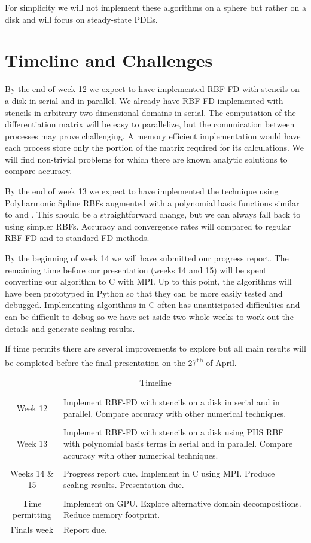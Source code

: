 \documentclass[12pt]{article}
\begin{document}
	For simplicity we will not implement these algorithms on a sphere but rather on a disk and will focus on steady-state PDEs.
	
\section{Timeline and Challenges}
	By the end of week 12 we expect to have implemented RBF-FD with stencils on a disk in serial and in parallel. We already have RBF-FD implemented with stencils in arbitrary two dimensional domains in serial. The computation of the differentiation matrix will be easy to parallelize, but the comunication between processes may prove challenging. A memory efficient implementation would have each process store only the portion of the matrix required for its calculations. We will find non-trivial problems for which there are known analytic solutions to compare accuracy.
	
	By the end of week 13 we expect to have implemented the technique using Polyharmonic Spline RBFs augmented with a polynomial basis functions similar to \cite{Flyer2016-1} and \cite{Flyer2017-2}. This should be a straightforward change, but we can always fall back to using simpler RBFs. Accuracy and convergence rates will compared to regular RBF-FD and to standard FD methods.
	
	
	By the beginning of week 14 we will have submitted our progress report. The remaining time before our presentation (weeks 14 and 15) will be spent converting our algorithm to C with MPI. Up to this point, the algorithms will have been prototyped in Python so that they can be more easily tested and debugged. Implementing algorithms in C often has unanticipated difficulties and can be difficult to debug so we have set aside two whole weeks to work out the details and generate scaling results. 
	
	If time permits there are several improvements to explore but all main results will be completed before the final presentation on the 27\textsuperscript{th} of April.
	
	\begin{table}
		\caption{Timeline}
		\begin{tabular}{ c| p{12cm}} 
			Week 12 & Implement RBF-FD with stencils on a disk in serial and in parallel. Compare accuracy with other numerical techniques.\\
			& \\
			Week 13 & Implement RBF-FD with stencils on a disk using PHS RBF with polynomial basis terms in serial and in parallel. Compare accuracy with other numerical techniques. \\
			&\\
			Weeks 14 \& 15 & Progress report due. Implement in C using MPI. Produce scaling results. Presentation due.\\
			&\\
			Time permitting &  Implement on GPU. Explore alternative domain decompositions. Reduce memory footprint.\\
			Finals week & Report due.
			
		\end{tabular}
		
	\end{table}
 
\pagebreak
 
\printbibliography
\end{document}
